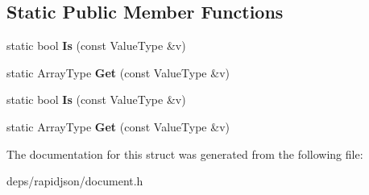 \subsection*{Static Public Member Functions}
\begin{DoxyCompactItemize}
\item 
static bool {\bfseries Is} (const Value\+Type \&v)\hypertarget{structinternal_1_1_type_helper_3_01_value_type_00_01typename_01_value_type_1_1_const_array_01_4_a259497292f89c58789b1e947249dd299}{}\label{structinternal_1_1_type_helper_3_01_value_type_00_01typename_01_value_type_1_1_const_array_01_4_a259497292f89c58789b1e947249dd299}

\item 
static Array\+Type {\bfseries Get} (const Value\+Type \&v)\hypertarget{structinternal_1_1_type_helper_3_01_value_type_00_01typename_01_value_type_1_1_const_array_01_4_a247811db25d6f25cc63175e03d847b8b}{}\label{structinternal_1_1_type_helper_3_01_value_type_00_01typename_01_value_type_1_1_const_array_01_4_a247811db25d6f25cc63175e03d847b8b}

\item 
static bool {\bfseries Is} (const Value\+Type \&v)\hypertarget{structinternal_1_1_type_helper_3_01_value_type_00_01typename_01_value_type_1_1_const_array_01_4_a259497292f89c58789b1e947249dd299}{}\label{structinternal_1_1_type_helper_3_01_value_type_00_01typename_01_value_type_1_1_const_array_01_4_a259497292f89c58789b1e947249dd299}

\item 
static Array\+Type {\bfseries Get} (const Value\+Type \&v)\hypertarget{structinternal_1_1_type_helper_3_01_value_type_00_01typename_01_value_type_1_1_const_array_01_4_a247811db25d6f25cc63175e03d847b8b}{}\label{structinternal_1_1_type_helper_3_01_value_type_00_01typename_01_value_type_1_1_const_array_01_4_a247811db25d6f25cc63175e03d847b8b}

\end{DoxyCompactItemize}


The documentation for this struct was generated from the following file\+:\begin{DoxyCompactItemize}
\item 
deps/rapidjson/document.\+h\end{DoxyCompactItemize}
